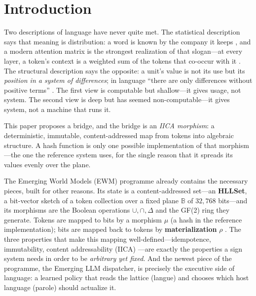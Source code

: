 \documentclass[11pt,a4paper]{article}
\theoremstyle{remark}
\newcommand{\Plane}{\ensuremath{\mathbb{B}}}            %
\newcommand{\xor}{\ensuremath{\Delta}}                   %
\newcommand{\Ing}{\ensuremath{\mu}}                      %
\newcommand{\Mat}{\ensuremath{\rho}}                     %
\begin{document}
\section{Introduction}
\label{sec:intro}

Two descriptions of language have never quite met. The statistical description
says that meaning is distribution: a word is known by the company it keeps
\cite{harris1954,firth1957}, and a modern attention matrix is the strongest
realization of that slogan---at every layer, a token's context is a weighted
sum of the tokens that co-occur with it \cite{vaswani2017}. The structural
description says the opposite: a unit's value is not its use but its
\emph{position in a system of differences}; in language ``there are only
differences without positive terms'' \cite{saussure1916}. The first view is
computable but shallow---it gives usage, not system. The second view is deep
but has seemed non-computable---it gives system, not a machine that runs it.

This paper proposes a bridge, and the bridge is an \emph{IICA morphism}: a
deterministic, immutable, content-addressed map from tokens into algebraic
structure. A hash function is only one possible implementation of that
morphism---the one the reference system uses, for the single reason that it
spreads its values evenly over the plane.

The Emerging World Models (EWM) programme \cite{ewm2026,companion2026,state2026}
already contains the necessary pieces, built for other reasons. Its state is a
content-addressed set---an \textbf{HLLSet}, a bit-vector sketch of a token
collection over a fixed plane $\Plane$ of $32{,}768$ bits---and its morphisms
are the Boolean operations $\cup, \cap, \xor$ and the GF(2) ring they generate.
Tokens are mapped to bits by a morphism $\Ing$ (a hash in the reference
implementation); bits are mapped back to tokens by
\textbf{materialization} $\Mat$ \cite{attention2026}. The three properties that
make this mapping well-defined---idempotence, immutability, content
addressability (IICA) \cite{ewm2026}---are exactly the properties a sign
system needs in order to be \emph{arbitrary yet fixed}. And the newest piece of
the programme, the Emerging LLM dispatcher, is precisely the executive side of
language: a learned policy that reads the lattice (langue) and chooses which
host language (parole) should actualize it.
\end{document}
